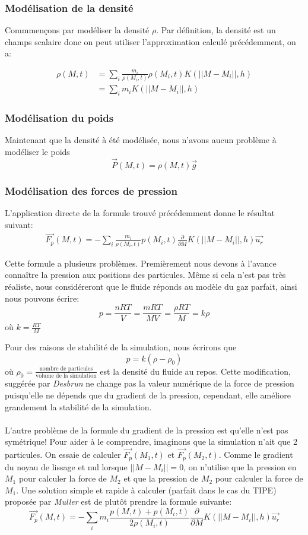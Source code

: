 \documentclass[a4paper,10pt]{report}
\begin{document}
\subsubsection{Modélisation de la densité}
Commmençons par modéliser la densité $\rho$. Par définition, la densité est un champs scalaire donc on peut utiliser l'approximation calculé précédemment, on a:

\begin{align}
 \rho(M,t) &= \sum_{i}\frac{m_i}{\rho(M_i, t)}\rho(M_i,t)K(||M - M_i||, h) \\
 &= \sum_i m_i K(||M - M_i||, h)
\end{align}

\subsubsection{Modélisation du poids}
Maintenant que la densité à été modélisée, nous n'avons aucun problème à modéliser le poids
$$\vec{P}(M,t) = \rho(M,t)\vec{g}$$

\subsubsection{Modélisation des forces de pression}
L'application directe de la formule trouvé précédemment donne le résultat suivant:
\begin{align}
\vec{F_p}(M,t) = -\sum_i \frac{m_i}{\rho(M_i,t)} p(M_i,t) \frac{\partial }{\partial M}K(||M - M_i||, h)\vec{u_r}
\end{align}

Cette formule a plusieurs problèmes. Premièrement nous devons à l'avance connaître la pression aux positions des particules. Même si cela n'est pas très réaliste, nous considéreront que le fluide réponds au modèle du gaz parfait, ainsi nous pouvons écrire:
$$p = \frac{nRT}{V} = \frac{mRT}{MV} = \frac{\rho RT}{M} = k\rho$$ où $k = \frac{RT}{M}$

Pour des raisons de stabilité de la simulation, nous écrirons que
$$p = k(\rho - \rho_0)$$ où $\rho_0 = \frac{\text{nombre de particules}}{\text{volume de la simulation}}$ est la densité du fluide au repos. Cette modification, suggérée par {\it Desbrun} ne change pas la valeur numérique de la force de pression puisqu'elle ne dépends que du gradient de la pression, cependant, elle améliore grandement la stabilité de la simulation.
\\
\\
L'autre problème de la formule du gradient de la pression est qu'elle n'est pas symétrique! Pour aider à le comprendre, imaginons que la simulation n'ait que 2 particules. On essaie de calculer $\vec{F_p}(M_1,t)$ et $\vec{F_p}(M_2,t)$. Comme le gradient du noyau de lissage et nul lorsque $||M - M_i|| = 0$, on n'utilise que la pression en $M_1$ pour calculer la force de $M_2$ et que la pression de $M_2$ pour calculer la force de $M_1$.
Une solution simple et rapide à calculer (parfait dans le cas du TIPE) proposée par {\it Muller} est de plutôt prendre la formule suivante:
$$ \vec{F_p}(M,t) = -\sum_i m_i\frac{p(M,t) + p(M_i,t)}{2\rho(M_i,t)}\frac{\partial}{\partial M}K(||M - M_i||, h)\vec{u_r}$$
\end{document}
